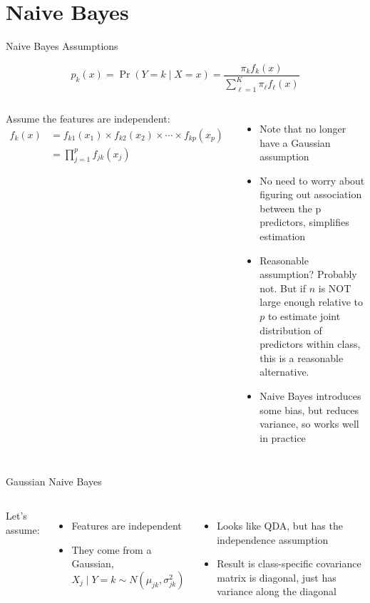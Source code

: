 \documentclass[aspectratio=169,usenames,dvipsnames]{beamer}
\newcommand{\InstructorList}[1]{
\begin{itemize}
	\color{orange}
	#1
\end{itemize}
}
\begin{document}
\section{Naive Bayes}
\begin{frame}[t]{Naive Bayes Assumptions}


	\begin{equation*}
		p_k(x) = \Pr(Y = k \mid X = x ) = \frac{ \pi_k f_k(x)}{\sum_{\ell = 1}^K \pi_\ell f_\ell(x)}
	\end{equation*}
\begin{columns}
\centering
Assume the features are independent:
\begin{align*}
	f_k(x) &= f_{k1}(x_1) \times f_{k2}(x_2) \times \cdots \times f_{kp}(x_p) \\
	&= \prod_{j=1}^p f_{jk}(x_j)
\end{align*}
\centering
\InstructorList{
\item Note that no longer have a Gaussian assumption
\item No need to worry about figuring out association between the p predictors, simplifies estimation
\item Reasonable assumption? Probably not. But if $n$ is NOT large enough relative to $p$ to estimate joint distribution of predictors within class, this is a reasonable alternative.
\item Naive Bayes introduces some bias, but reduces variance, so works well in practice

}
\end{columns}

\end{frame}
\begin{frame}[c]{Gaussian Naive Bayes}

\begin{columns}
\centering
Let's assume:
\begin{itemize}
	\item Features are independent
	\item They come from a Gaussian, $X_j \mid Y = k \sim N(\mu_{jk},\sigma^2_{jk})$
\end{itemize}
\centering
\InstructorList{
\item Looks like QDA, but has the independence assumption
\item Result is class-specific  covariance matrix is diagonal, just has variance along the diagonal
}
\end{columns}

\end{frame}
\end{document}
